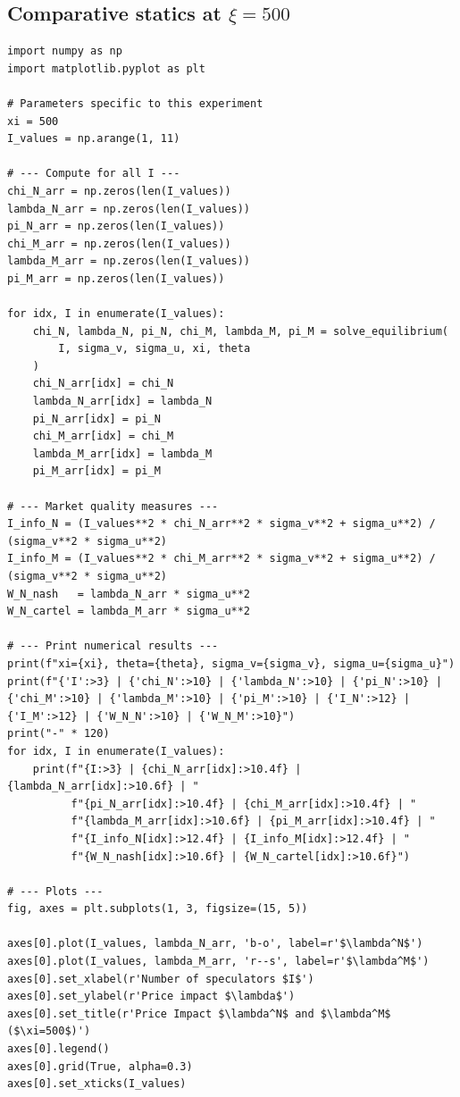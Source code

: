 \subsection{Comparative statics at $\xi=500$}

\begin{lstlisting}[style=pythonstyle]
import numpy as np
import matplotlib.pyplot as plt

# Parameters specific to this experiment
xi = 500
I_values = np.arange(1, 11)

# --- Compute for all I ---
chi_N_arr = np.zeros(len(I_values))
lambda_N_arr = np.zeros(len(I_values))
pi_N_arr = np.zeros(len(I_values))
chi_M_arr = np.zeros(len(I_values))
lambda_M_arr = np.zeros(len(I_values))
pi_M_arr = np.zeros(len(I_values))

for idx, I in enumerate(I_values):
    chi_N, lambda_N, pi_N, chi_M, lambda_M, pi_M = solve_equilibrium(
        I, sigma_v, sigma_u, xi, theta
    )
    chi_N_arr[idx] = chi_N
    lambda_N_arr[idx] = lambda_N
    pi_N_arr[idx] = pi_N
    chi_M_arr[idx] = chi_M
    lambda_M_arr[idx] = lambda_M
    pi_M_arr[idx] = pi_M

# --- Market quality measures ---
I_info_N = (I_values**2 * chi_N_arr**2 * sigma_v**2 + sigma_u**2) / (sigma_v**2 * sigma_u**2)
I_info_M = (I_values**2 * chi_M_arr**2 * sigma_v**2 + sigma_u**2) / (sigma_v**2 * sigma_u**2)
W_N_nash   = lambda_N_arr * sigma_u**2
W_N_cartel = lambda_M_arr * sigma_u**2

# --- Print numerical results ---
print(f"xi={xi}, theta={theta}, sigma_v={sigma_v}, sigma_u={sigma_u}")
print(f"{'I':>3} | {'chi_N':>10} | {'lambda_N':>10} | {'pi_N':>10} | {'chi_M':>10} | {'lambda_M':>10} | {'pi_M':>10} | {'I_N':>12} | {'I_M':>12} | {'W_N_N':>10} | {'W_N_M':>10}")
print("-" * 120)
for idx, I in enumerate(I_values):
    print(f"{I:>3} | {chi_N_arr[idx]:>10.4f} | {lambda_N_arr[idx]:>10.6f} | "
          f"{pi_N_arr[idx]:>10.4f} | {chi_M_arr[idx]:>10.4f} | "
          f"{lambda_M_arr[idx]:>10.6f} | {pi_M_arr[idx]:>10.4f} | "
          f"{I_info_N[idx]:>12.4f} | {I_info_M[idx]:>12.4f} | "
          f"{W_N_nash[idx]:>10.6f} | {W_N_cartel[idx]:>10.6f}")

# --- Plots ---
fig, axes = plt.subplots(1, 3, figsize=(15, 5))

axes[0].plot(I_values, lambda_N_arr, 'b-o', label=r'$\lambda^N$')
axes[0].plot(I_values, lambda_M_arr, 'r--s', label=r'$\lambda^M$')
axes[0].set_xlabel(r'Number of speculators $I$')
axes[0].set_ylabel(r'Price impact $\lambda$')
axes[0].set_title(r'Price Impact $\lambda^N$ and $\lambda^M$ ($\xi=500$)')
axes[0].legend()
axes[0].grid(True, alpha=0.3)
axes[0].set_xticks(I_values)


\end{lstlisting}
